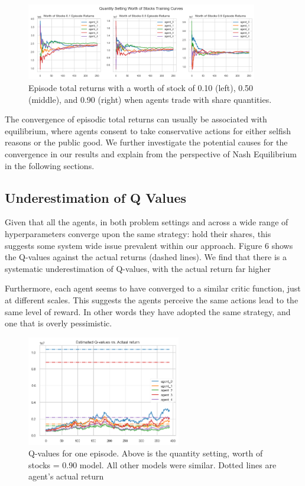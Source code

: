 \documentclass{article}
\begin{document}
\begin{figure}[h!]
    \centering
    \includegraphics[width=0.90\textwidth]{quantity_setting_stocks.png}
    \caption{Episode total returns with a worth of stock of 0.10 (left), 0.50 (middle), and 0.90 (right) when agents trade with share quantities.} %
    \label{fig: 5}
\end{figure}

The convergence of episodic total returns can usually be associated with equilibrium, where agents consent to take conservative actions for either selfish reasons or the public good. We further investigate the potential causes for the convergence in our results and explain from the perspective of Nash Equilibrium in the following sections.




\subsection{Underestimation of Q Values}
Given that all the agents, in both problem settings and across a wide range of hyperparameters converge upon the same strategy: hold their shares, this suggests some system wide issue prevalent within our approach. Figure 6 shows the Q-values against the actual returns (dashed lines). We find that there is a systematic underestimation of Q-values, with the actual return far higher 

Furthermore, each agent seems to have converged to a similar critic function, just at different scales. This suggests the agents perceive the same actions lead to the same level of reward. In other words they have adopted the same strategy, and one that is overly pessimistic.

\begin{figure}[h!]
    \centering
    \includegraphics[width=0.6\textwidth]{img/final/q_values.png}
    \caption{Q-values for one episode. Above is the quantity setting, worth of stocks = 0.90 model. All other models were similar. Dotted lines are agent's actual return}%
    \label{fig: 6}
\end{figure}
\end{document}
